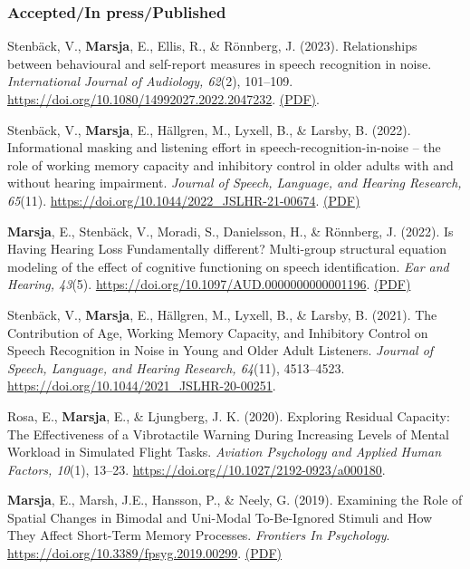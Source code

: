 \documentclass[]{article}
\begin{document}
\hypertarget{acceptedin-presspublished}{%
\subsubsection{Accepted/In
press/Published}\label{acceptedin-presspublished}}

Stenbäck, V., \textbf{Marsja}, E., Ellis, R., \& Rönnberg, J. (2023).
Relationships between behavioural and self-report measures in speech
recognition in noise. \emph{International Journal of Audiology, 62}(2),
101--109. \url{https://doi.org/10.1080/14992027.2022.2047232}.
\href{https://bit.ly/IJA2022}{(PDF)}.

Stenbäck, V., \textbf{Marsja}, E., Hällgren, M., Lyxell, B., \& Larsby,
B. (2022). Informational masking and listening effort in
speech-recognition-in-noise -- the role of working memory capacity and
inhibitory control in older adults with and without hearing impairment.
\emph{Journal of Speech, Language, and Hearing Research, 65}(11).
\url{https://doi.org/10.1044/2022_JSLHR-21-00674}.
\href{https://bit.ly/JSLHR22b}{(PDF)}

\textbf{Marsja}, E., Stenbäck, V., Moradi, S., Danielsson, H., \&
Rönnberg, J. (2022). Is Having Hearing Loss Fundamentally different?
Multi-group structural equation modeling of the effect of cognitive
functioning on speech identification. \emph{Ear and Hearing, 43}(5).
\url{https://doi.org/10.1097/AUD.0000000000001196}.
\href{https://bit.ly/EANDH22}{(PDF)}

Stenbäck, V., \textbf{Marsja}, E., Hällgren, M., Lyxell, B., \& Larsby,
B. (2021). The Contribution of Age, Working Memory Capacity, and
Inhibitory Control on Speech Recognition in Noise in Young and Older
Adult Listeners. \emph{Journal of Speech, Language, and Hearing
Research, 64}(11), 4513--4523.
\url{https://doi.org/10.1044/2021_JSLHR-20-00251}.

Rosa, E., \textbf{Marsja}, E., \& Ljungberg, J. K. (2020). Exploring
Residual Capacity: The Effectiveness of a Vibrotactile Warning During
Increasing Levels of Mental Workload in Simulated Flight Tasks.
\emph{Aviation Psychology and Applied Human Factors, 10}(1), 13--23.
\url{https://doi.org//10.1027/2192-0923/a000180}.

\textbf{Marsja}, E., Marsh, J.E., Hansson, P., \& Neely, G. (2019).
Examining the Role of Spatial Changes in Bimodal and Uni-Modal
To-Be-Ignored Stimuli and How They Affect Short-Term Memory Processes.
\emph{Frontiers In Psychology}.
\url{https://doi.org/10.3389/fpsyg.2019.00299}.
\href{https://bit.ly/3LkKD19}{(PDF)}
\end{document}
